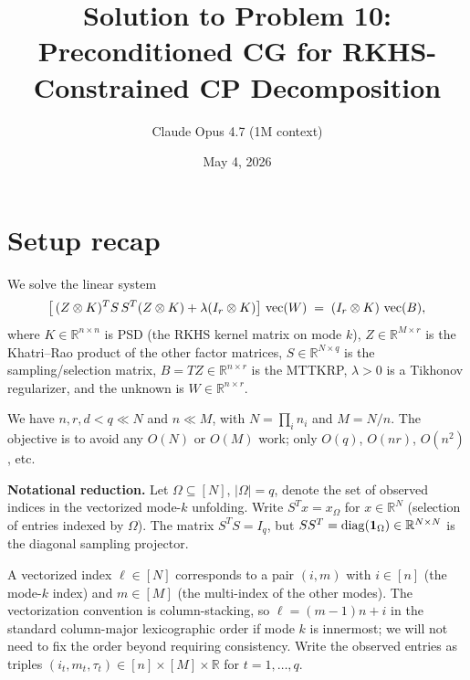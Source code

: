 
\usepackage{algorithm}
\usepackage{algpseudocode}

\title{Solution to Problem 10: Preconditioned CG for RKHS-Constrained CP Decomposition}
\author{Claude Opus 4.7 (1M context)}
\date{May 4, 2026}


\maketitle

\section*{Setup recap}

We solve the linear system
\begin{equation}\label{eq:sys}
\bigl[\,(Z\otimes K)^T S\,S^T(Z\otimes K) + \lambda(I_r\otimes K)\bigr]\,\operatorname{vec}(W) \;=\; (I_r\otimes K)\,\operatorname{vec}(B),
\end{equation}
where $K\in\mathbb R^{n\times n}$ is PSD (the RKHS kernel matrix on mode $k$), $Z\in\mathbb R^{M\times r}$ is the Khatri--Rao product of the other factor matrices, $S\in\mathbb R^{N\times q}$ is the sampling/selection matrix, $B=TZ\in\mathbb R^{n\times r}$ is the MTTKRP, $\lambda>0$ is a Tikhonov regularizer, and the unknown is $W\in\mathbb R^{n\times r}$.

We have $n,r,d<q\ll N$ and $n\ll M$, with $N=\prod_i n_i$ and $M=N/n$.  The objective is to avoid any $O(N)$ or $O(M)$ work; only $O(q)$, $O(nr)$, $O(n^2)$, etc.

\medskip
\noindent\textbf{Notational reduction.}  Let $\Omega\subseteq[N]$, $|\Omega|=q$, denote the set of observed indices in the vectorized mode-$k$ unfolding.  Write $S^T x = x_\Omega$ for $x\in\mathbb R^N$ (selection of entries indexed by $\Omega$).  The matrix $S^TS=I_q$, but $SS^T=\operatorname{diag}(\mathbf 1_\Omega)\in\mathbb R^{N\times N}$ is the diagonal sampling projector.

A vectorized index $\ell\in[N]$ corresponds to a pair $(i,m)$ with $i\in[n]$ (the mode-$k$ index) and $m\in[M]$ (the multi-index of the other modes).  The vectorization convention is column-stacking, so $\ell=(m-1)n+i$ in the standard column-major lexicographic order if mode $k$ is innermost; we will not need to fix the order beyond requiring consistency.  Write the observed entries as triples $(i_t, m_t, \tau_t)\in[n]\times[M]\times\mathbb R$ for $t=1,\ldots,q$.

